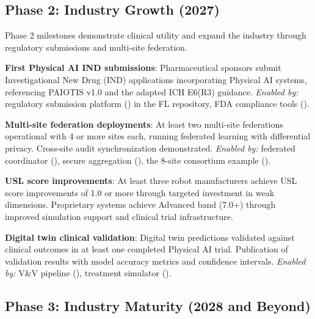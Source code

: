 \documentclass[11pt,letterpaper]{article}
\begin{document}
\subsection{Phase 2: Industry Growth (2027)}

Phase 2 milestones demonstrate clinical utility and expand the industry through regulatory submissions and multi-site federation.

\begin{description}[leftmargin=3.5cm, style=sameline]
  \item[Q1 2027] \textbf{First Physical AI IND submissions}: Pharmaceutical sponsors submit Investigational New Drug (IND) applications incorporating Physical AI systems, referencing PAIOTIS v1.0 and the adapted ICH E6(R3) guidance. \textit{Enabled by:} regulatory submission platform () in the FL repository, FDA compliance tools ().

  \item[Q2 2027] \textbf{Multi-site federation deployments}: At least two multi-site federations operational with 4 or more sites each, running federated learning with differential privacy. Cross-site audit synchronization demonstrated. \textit{Enabled by:} federated coordinator (), secure aggregation (), the 8-site consortium example ().

  \item[Q3 2027] \textbf{USL score improvements}: At least three robot manufacturers achieve USL score improvements of 1.0 or more through targeted investment in weak dimensions. Proprietary systems achieve Advanced band (7.0+) through improved simulation support and clinical trial infrastructure.

  \item[Q4 2027] \textbf{Digital twin clinical validation}: Digital twin predictions validated against clinical outcomes in at least one completed Physical AI trial. Publication of validation results with model accuracy metrics and confidence intervals. \textit{Enabled by:} V\&V pipeline (), treatment simulator ().
\end{description}

\subsection{Phase 3: Industry Maturity (2028 and Beyond)}
\end{document}
